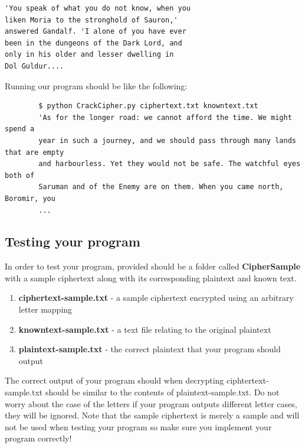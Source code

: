 \documentclass{article}
\begin{document}
\begin{file}
\begin{lstlisting}[]
'You speak of what you do not know, when you
liken Moria to the stronghold of Sauron,'
answered Gandalf. 'I alone of you have ever
been in the dungeons of the Dark Lord, and
only in his older and lesser dwelling in
Dol Guldur....
\end{lstlisting}
\end{file}

Running our program should be like the following:

\begin{commandline}
	\begin{verbatim}
		$ python CrackCipher.py ciphertext.txt knowntext.txt
		'As for the longer road: we cannot afford the time. We might spend a
		year in such a journey, and we should pass through many lands that are empty
		and harbourless. Yet they would not be safe. The watchful eyes both of
		Saruman and of the Enemy are on them. When you came north, Boromir, you
		...
	\end{verbatim}
\end{commandline}

\subsection{Testing your program}
In order to test your program, provided should be a folder called \textbf{CipherSample} with a sample ciphertext along with its corresponding plaintext and known text.
\begin{enumerate}
\item \textbf{ciphertext-sample.txt} - a sample ciphertext encrypted using an arbitrary letter mapping
\item \textbf{knowntext-sample.txt} - a text file relating to the original plaintext
\item \textbf{plaintext-sample.txt} - the correct plaintext that your program should output
\end{enumerate}

\begin{info}[Correctness:] %
The correct output of your program should when decrypting ciphtertext-sample.txt should be similar to the contents of plaintext-sample.txt. Do not worry about the case of the letters if your program outputs different letter cases, they will be ignored. Note that the sample ciphertext is merely a sample and will not be used when testing your program so make sure you implement your program correctly!
\end{info}
\end{document}
